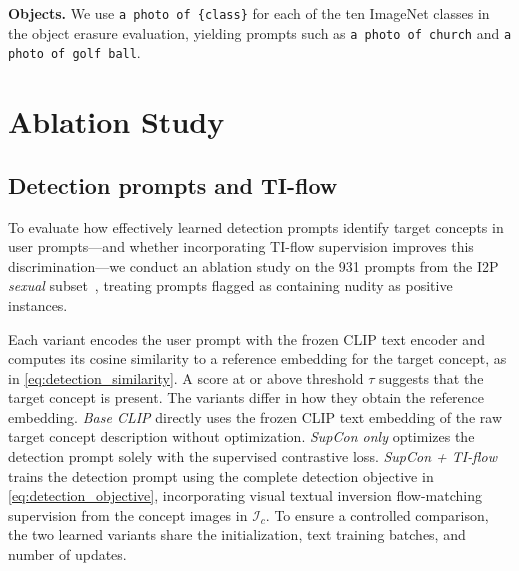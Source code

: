\noindent\textbf{Objects.}
We use \texttt{a photo of \{class\}} for each of the ten ImageNet classes in the object erasure evaluation, yielding prompts such as \texttt{a photo of church} and \texttt{a photo of golf ball}.


\section{Ablation Study}
\label{sec:suppl_ablation}

\subsection{Detection prompts and TI-flow}
\label{sec:suppl_detection_ablation}

To evaluate how effectively learned detection prompts identify target concepts in user prompts---and 
whether incorporating TI-flow supervision improves this discrimination---we conduct an ablation study 
on the 931 prompts from the I2P \textit{sexual} subset~\cite{Schramowski_2023_CVPR}, treating 
prompts flagged as containing nudity as positive instances.


Each variant encodes the user prompt with the frozen CLIP text encoder and computes its cosine similarity 
to a reference embedding for the target concept, as in \cref{eq:detection_similarity}.
A score at or above threshold $\tau$ suggests that the target concept is present.
The variants differ in how they obtain the reference embedding.
\emph{Base CLIP} directly uses the frozen CLIP text embedding of the raw target concept description without optimization.
\emph{SupCon only} optimizes the detection prompt solely with the supervised contrastive loss.
\emph{SupCon + TI-flow} trains the detection prompt using the complete detection objective in \cref{eq:detection_objective}, 
incorporating visual textual inversion flow-matching supervision from the concept images in $\mathcal{I}_c$.
To ensure a controlled comparison, the two learned variants share the initialization, text training batches, and number of updates.

